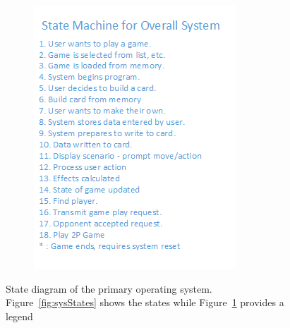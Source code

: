 \documentclass[12pt]{article} %
\begin{document}
\begin{figure}[H]
\begin{subfigure}{0.48\textwidth}
		\includegraphics[width=\textwidth]{images/OSStates.png}
		\caption{}
		\label{fig:statesLegend}
	\end{subfigure}
	\caption{State diagram of the primary operating system.
		Figure~\ref{fig:sysStates} shows the states while
		Figure~\ref{fig:statesLegend} provides a legend}
	\label{fig:systemStateDiagram}
\end{figure}
\end{document}
